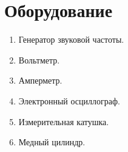 \section*{Оборудование}

\begin{enumerate}
	\item Генератор звуковой частоты.
	
	\item Вольтметр.
	
	\item Амперметр.
	
	\item Электронный осциллограф.
	
	\item Измерительная катушка.
	
	\item Медный цилиндр.
\end{enumerate}
